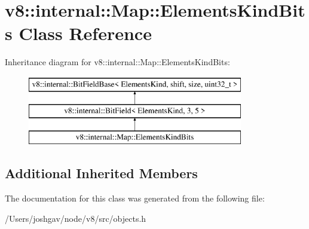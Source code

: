 \hypertarget{classv8_1_1internal_1_1_map_1_1_elements_kind_bits}{}\section{v8\+:\+:internal\+:\+:Map\+:\+:Elements\+Kind\+Bits Class Reference}
\label{classv8_1_1internal_1_1_map_1_1_elements_kind_bits}
Inheritance diagram for v8\+:\+:internal\+:\+:Map\+:\+:Elements\+Kind\+Bits\+:\begin{figure}[H]
\begin{center}
\leavevmode
\includegraphics[height=3.000000cm]{classv8_1_1internal_1_1_map_1_1_elements_kind_bits}
\end{center}
\end{figure}
\subsection*{Additional Inherited Members}


The documentation for this class was generated from the following file\+:\begin{DoxyCompactItemize}
\item 
/\+Users/joshgav/node/v8/src/objects.\+h\end{DoxyCompactItemize}
